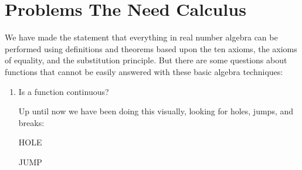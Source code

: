 \documentclass[letterpaper,12pt,fleqn]{article}
\begin{document}
\section*{Problems The Need Calculus}

We have made the statement that everything in real number algebra can be performed using definitions and theorems
based upon the ten axioms, the axioms of equality, and the substitution principle.  But there are some questions
about functions that cannot be easily answered with these basic algebra techniques:
\begin{enumerate}[left=0pt]
\item Is a function continuous?
  
  Up until now we have been doing this visually, looking for holes, jumps, and breaks:

  \begin{minipage}{2in}
    \begin{center}

      HOLE
    \end{center}
  \end{minipage}
  \begin{minipage}{2in}
    \begin{center}

      JUMP
    \end{center}
  \end{minipage}
  \begin{minipage}{2in}
    \begin{center}


\end{center}
\end{minipage}
\end{enumerate}
\end{document}
